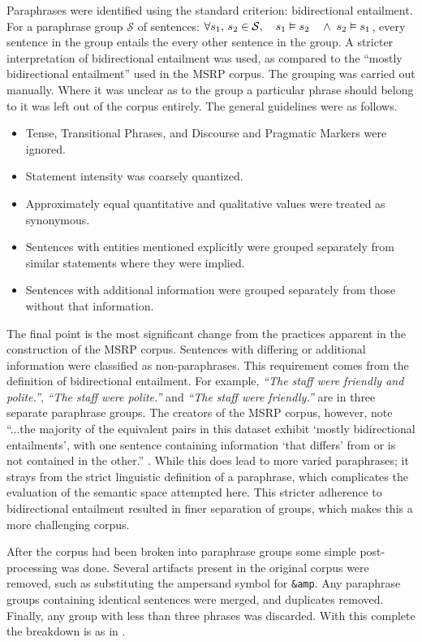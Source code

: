 \documentclass[]{book}
\begin{document}
Paraphrases were identified using the standard criterion: bidirectional
entailment. For a paraphrase group $\mathcal{S}$ of sentences: $\forall s_{1},\,s_{2}\in\mathcal{S},\quad s_{1}\vDash s_{2}\quad\wedge\;s_{2}\vDash s_{1}$,
every sentence in the group entails the every other sentence in the
group. A stricter interpretation of bidirectional entailment was used,
as compared to the ``mostly bidirectional entailment'' used in the
MSRP corpus. The grouping was carried out manually. Where it was unclear
as to the group a particular phrase should belong to it was left out
of the corpus entirely. The general guidelines were as follows.
\begin{itemize}
\item Tense, Transitional Phrases, and Discourse and Pragmatic Markers were
ignored.
\item Statement intensity was coarsely quantized. 
\item Approximately equal quantitative and qualitative values were treated
as synonymous.
\item Sentences with entities mentioned explicitly were grouped separately
from similar statements where they were implied.
\item Sentences with additional information were grouped separately from
those without that information.
\end{itemize}
The final point is the most significant change from the practices
apparent in the construction of the MSRP corpus. Sentences with differing
or additional information were classified as non-paraphrases. This
requirement comes from the definition of bidirectional entailment.
For example, \emph{``The staff were friendly and polite.''}, \emph{``The
staff were polite.''} and \emph{``The staff were friendly.''} are
in three separate paraphrase groups. The creators of the MSRP corpus,
however, note ``...the majority of the equivalent pairs in this dataset
exhibit `mostly bidirectional entailments', with one sentence containing
information `that differs' from or is not contained in the other.''
\citep{msrParapharaCorpus}. While this does lead to more varied paraphrases;
it strays from the strict linguistic definition of a paraphrase, which
complicates the evaluation of the semantic space attempted here. This
stricter adherence to bidirectional entailment resulted in finer separation
of groups, which makes this a more challenging corpus.

After the corpus had been broken into paraphrase groups some simple
post-processing was done. Several artifacts present in the original
corpus were removed, such as substituting the ampersand symbol for
\texttt{\&amp}. Any paraphrase groups containing identical sentences
were merged, and duplicates removed. Finally, any group with less
than three phrases was discarded. With this complete the breakdown
is as in .
\end{document}

